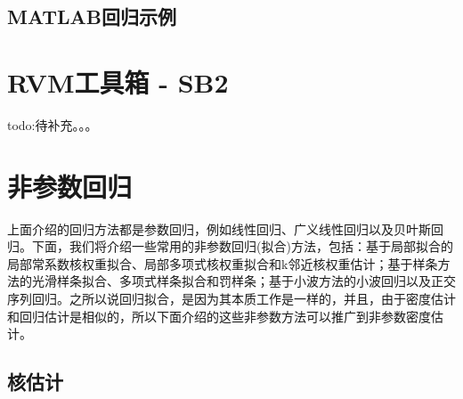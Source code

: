     \subsection{MATLAB回归示例}

\section{RVM工具箱 - SB2}
    \par
    todo:待补充。。。


\section{非参数回归}
    \par
    上面介绍的回归方法都是参数回归，例如线性回归、广义线性回归以及贝叶斯回归。下面，我们将介绍一些常用的非参数回归(拟合)方法，包括：基于局部拟合的局部常系数核权重拟合、局部多项式核权重拟合和k邻近核权重估计；基于样条方法的光滑样条拟合、多项式样条拟合和罚样条；基于小波方法的小波回归以及正交序列回归。之所以说回归拟合，是因为其本质工作是一样的，并且，由于密度估计和回归估计是相似的，所以下面介绍的这些非参数方法可以推广到非参数密度估计。
    \subsection{核估计}
